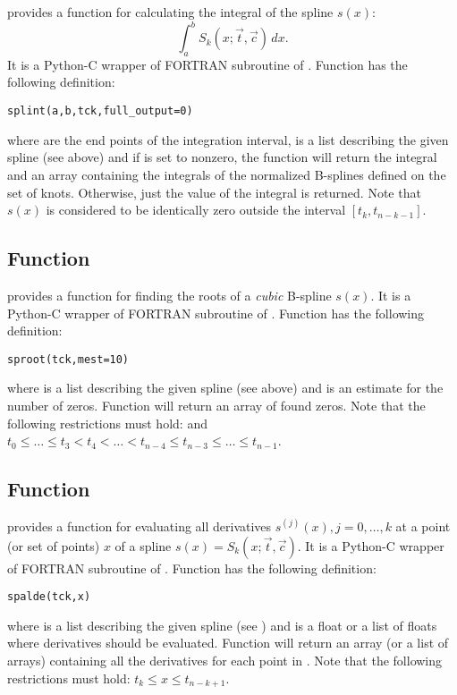 provides a function  for calculating the
integral of the spline $s(x)$:
\begin{displaymath}
  \int_a^b S_k(x;\vec t,\vec c)\,dx.
\end{displaymath}
It is a Python-C wrapper of FORTRAN subroutine  of .
Function  has the following definition:
\begin{verbatim}
splint(a,b,tck,full_output=0)
\end{verbatim}
where  are the end points of the integration interval,
 is a list describing the given spline (see above) and if
 is set to nonzero, the function  will
return the integral and an array containing the integrals of the
normalized B-splines defined on the set of knots. Otherwise, just the
value of the integral is returned. Note that $s(x)$ is considered to
be identically zero outside the interval $[t_{k},t_{n-k-1}]$.

\subsection{Function }
\label{sec:sproot}

 provides a function  for finding the
roots of a \emph{cubic} B-spline $s(x)$.
It is a Python-C wrapper of FORTRAN subroutine  of .
Function  has the following definition:
\begin{verbatim}
sproot(tck,mest=10)
\end{verbatim}
where  is a list describing the given spline (see above) and
 is an estimate for the number of zeros.
Function  will return an array of found zeros. Note that
the following restrictions must hold:  and
$t_0\leqslant\ldots\leqslant t_3<t_4<\ldots<t_{n-4}\leqslant
t_{n-3}\leqslant\ldots\leqslant t_{n-1}$.

\subsection{Function }
\label{sec:spalde}

 provides a function  for evaluating all
derivatives $s^{(j)}(x),j=0,\ldots,k$ at a point (or set of points) $x$
of a spline $s(x)=S_k(x;\vec t,\vec c)$.
It is a Python-C wrapper of FORTRAN subroutine  of .
Function  has the following definition:
\begin{verbatim}
spalde(tck,x)
\end{verbatim}
where  is a list describing the given spline (see
) and  is a float or a list of floats where
derivatives should be evaluated.  Function  will return
an array (or a list of arrays) containing all the derivatives for each
point in .  Note that the following restrictions must hold:
$t_k\leqslant x\leqslant t_{n-k+1}$.

